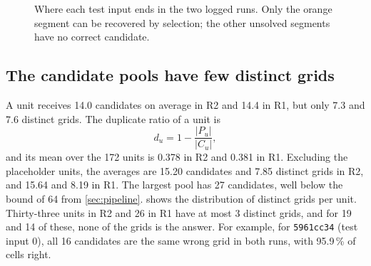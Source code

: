 \documentclass[11pt]{article}
\newcommand{\code}[1]{\texttt{#1}}
\newcommand{\R}[1]{R#1}
\begin{document}
\begin{figure}[t]
\centering
{}
\caption{Where each test input ends in the two logged runs. Only the orange segment can be recovered by selection; the other unsolved segments have no correct candidate.}
\label{fig:loss}
\end{figure}

\subsection{The candidate pools have few distinct grids}
\label{sec:diversity}

A unit receives 14.0 candidates on average in \R{2} and 14.4 in \R{1}, but only 7.3 and 7.6 distinct grids. The duplicate ratio of a unit is
\begin{equation}
\label{eq:dup}
d_u = 1 - \frac{|P_u|}{|C_u|} ,
\end{equation}
and its mean over the 172 units is 0.378 in \R{2} and 0.381 in \R{1}.
Excluding the placeholder units, the averages are 15.20 candidates and 7.85 distinct grids in \R{2}, and 15.64 and 8.19 in \R{1}. The largest pool has 27 candidates, well below the bound of 64 from \cref{sec:pipeline}.
 shows the distribution of distinct grids per unit. Thirty-three units in \R{2} and 26 in \R{1} have at most 3 distinct grids, and for 19 and 14 of these, none of the grids is the answer.
For example, for \code{5961cc34} (test input 0), all 16 candidates are the same wrong grid in both runs, with 95.9\,\% of cells right.
\end{document}
